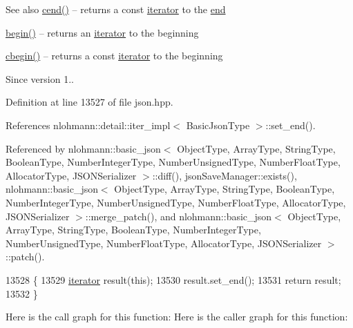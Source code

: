 \begin{DoxySeeAlso}{See also}
\hyperlink{classnlohmann_1_1basic__json_a8dba7b7d2f38e6b0c614030aa43983f6}{cend()} -- returns a const \hyperlink{classnlohmann_1_1basic__json_a099316232c76c034030a38faa6e34dca}{iterator} to the \hyperlink{classnlohmann_1_1basic__json_a13e032a02a7fd8a93fdddc2fcbc4763c}{end} 

\hyperlink{classnlohmann_1_1basic__json_a0ff28dac23f2bdecee9564d07f51dcdc}{begin()} -- returns an \hyperlink{classnlohmann_1_1basic__json_a099316232c76c034030a38faa6e34dca}{iterator} to the beginning 

\hyperlink{classnlohmann_1_1basic__json_ad865d6c291b237ae508d5cb2146b5877}{cbegin()} -- returns a const \hyperlink{classnlohmann_1_1basic__json_a099316232c76c034030a38faa6e34dca}{iterator} to the beginning
\end{DoxySeeAlso}
\begin{DoxySince}{Since}
version 1.. 
\end{DoxySince}


Definition at line 13527 of file json.\+hpp.



References nlohmann\+::detail\+::iter\+\_\+impl$<$ Basic\+Json\+Type $>$\+::set\+\_\+end().



Referenced by nlohmann\+::basic\+\_\+json$<$ Object\+Type, Array\+Type, String\+Type, Boolean\+Type, Number\+Integer\+Type, Number\+Unsigned\+Type, Number\+Float\+Type, Allocator\+Type, J\+S\+O\+N\+Serializer $>$\+::diff(), json\+Save\+Manager\+::exists(), nlohmann\+::basic\+\_\+json$<$ Object\+Type, Array\+Type, String\+Type, Boolean\+Type, Number\+Integer\+Type, Number\+Unsigned\+Type, Number\+Float\+Type, Allocator\+Type, J\+S\+O\+N\+Serializer $>$\+::merge\+\_\+patch(), and nlohmann\+::basic\+\_\+json$<$ Object\+Type, Array\+Type, String\+Type, Boolean\+Type, Number\+Integer\+Type, Number\+Unsigned\+Type, Number\+Float\+Type, Allocator\+Type, J\+S\+O\+N\+Serializer $>$\+::patch().


\begin{DoxyCode}
13528     \{
13529         \hyperlink{classnlohmann_1_1basic__json_a099316232c76c034030a38faa6e34dca}{iterator} result(\textcolor{keyword}{this});
13530         result.set\_end();
13531         \textcolor{keywordflow}{return} result;
13532     \}
\end{DoxyCode}
Here is the call graph for this function\+:
Here is the caller graph for this function\+:
\mbox{\label{classnlohmann_1_1basic__json_a1c15707055088cd5436ae91db72cbe67}} 

